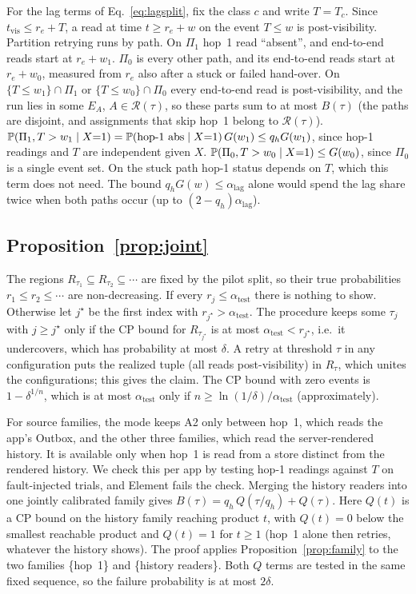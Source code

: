 For the lag terms of Eq.~\eqref{eq:lagsplit}, fix the class $c$ and write $T=T_c$. Since $t_{\mathrm{vis}}\le r_e+T$, a read at time $t\ge r_e+w$ on the event $T\le w$ is post-visibility. Partition retrying runs by path. On $\Pi_1$ hop~1 read ``absent'', and end-to-end reads start at $r_e+w_1$. $\Pi_0$ is every other path, and its end-to-end reads
start at $r_e+w_0$, measured from $r_e$ also after a stuck or failed hand-over. On $\{T\le w_1\}\cap\Pi_1$ or $\{T\le w_0\}\cap\Pi_0$ every end-to-end read is post-visibility, and the run
lies in some $E_A$, $A\in\mathcal R(\tau)$, so these parts sum to at most $B(\tau)$ (the paths are disjoint, and assignments that skip hop~1 belong to $\mathcal R(\tau)$).
$\mathbb{P}(\Pi_1,T>w_1\mid X{=}1)=\mathbb{P}(\text{hop-1 abs}\mid X{=}1)\,G(w_1)\le q_hG(w_1)$, since hop-1 readings and $T$ are independent given $X$. $\mathbb{P}(\Pi_0,T>w_0\mid X{=}1)\le G(w_0)$,
since $\Pi_0$ is a single event set. On the stuck path hop-1 status depends on $T$, which this term does not need. The bound $q_hG(w)\le\alpha_{\mathrm{lag}}$ alone would spend the lag
share twice when both paths occur (up to $(2-q_h)\alpha_{\mathrm{lag}}$).

\subsection{Proposition~\ref{prop:joint}}
The regions $R_{\tau_1}\subseteq R_{\tau_2}\subseteq\cdots$ are fixed by the pilot split, so their true probabilities $r_1\le r_2\le\cdots$ are non-decreasing. If every $r_j\le\alpha_{\mathrm{test}}$
there is nothing to show. Otherwise let $j^\star$ be the first index with $r_{j^\star}>\alpha_{\mathrm{test}}$. The procedure keeps some $\tau_j$ with $j\ge j^\star$ only if the CP bound for $R_{\tau_{j^\star}}$
is at most $\alpha_{\mathrm{test}}<r_{j^\star}$, i.e.\ it undercovers, which has probability at most $\delta$. A retry at threshold $\tau$ in any configuration puts the realized tuple (all reads post-visibility) in $R_\tau$, which unites the configurations; this gives
the claim. The CP bound with zero events is $1-\delta^{1/n}$, which is at most $\alpha_{\mathrm{test}}$ only if $n\ge\ln(1/\delta)/\alpha_{\mathrm{test}}$ (approximately).

For source families, the mode keeps A2 only between hop~1, which reads the app's Outbox, and the other three families, which read the server-rendered history.
It is available only when hop~1 is read from a store distinct from the rendered history. We check this per app by testing hop-1 readings against $T$ on fault-injected
trials, and Element fails the check. Merging the history readers into one jointly calibrated family gives $B(\tau)=q_h\,Q(\tau/q_h)+Q(\tau)$. Here $Q(t)$ is a CP bound on the
history family reaching product $t$, with $Q(t)=0$ below the smallest reachable product and $Q(t)=1$ for $t\ge1$ (hop~1 alone then retries, whatever the history shows).
The proof applies Proposition~\ref{prop:family} to the two families \{hop~1\} and \{history readers\}. Both $Q$ terms are tested in the same fixed sequence, so the failure
probability is at most $2\delta$.

